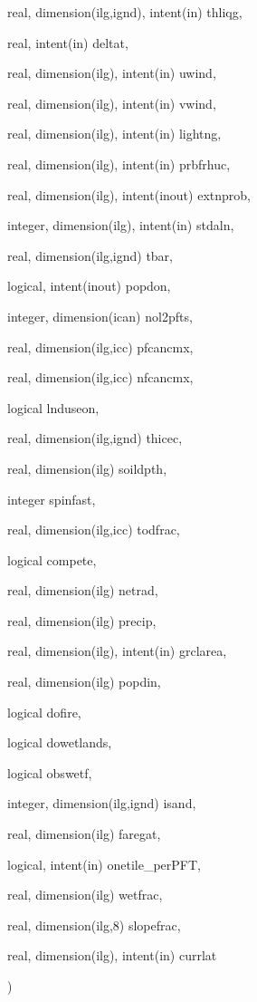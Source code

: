 {\begin{DoxyParamCaption}
\item[{real, dimension(ilg,ignd), intent(in)}]{thliqg, }
\item[{real, intent(in)}]{deltat, }
\item[{real, dimension(ilg), intent(in)}]{uwind, }
\item[{real, dimension(ilg), intent(in)}]{vwind, }
\item[{real, dimension(ilg), intent(in)}]{lightng, }
\item[{real, dimension(ilg), intent(in)}]{prbfrhuc, }
\item[{real, dimension(ilg), intent(inout)}]{extnprob, }
\item[{integer, dimension(ilg), intent(in)}]{stdaln, }
\item[{real, dimension(ilg,ignd)}]{tbar, }
\item[{logical, intent(inout)}]{popdon, }
\item[{integer, dimension(ican)}]{nol2pfts, }
\item[{real, dimension(ilg,icc)}]{pfcancmx, }
\item[{real, dimension(ilg,icc)}]{nfcancmx, }
\item[{logical}]{lnduseon, }
\item[{real, dimension(ilg,ignd)}]{thicec, }
\item[{real, dimension(ilg)}]{soildpth, }
\item[{integer}]{spinfast, }
\item[{real, dimension(ilg,icc)}]{todfrac, }
\item[{logical}]{compete, }
\item[{real, dimension(ilg)}]{netrad, }
\item[{real, dimension(ilg)}]{precip, }
\item[{real, dimension(ilg), intent(in)}]{grclarea, }
\item[{real, dimension(ilg)}]{popdin, }
\item[{logical}]{dofire, }
\item[{logical}]{dowetlands, }
\item[{logical}]{obswetf, }
\item[{integer, dimension(ilg,ignd)}]{isand, }
\item[{real, dimension(ilg)}]{faregat, }
\item[{logical, intent(in)}]{onetile\+\_\+per\+P\+F\+T, }
\item[{real, dimension(ilg)}]{wetfrac, }
\item[{real, dimension(ilg,8)}]{slopefrac, }
\item[{real, dimension(ilg), intent(in)}]{currlat}
\end{DoxyParamCaption}
)}\label{ctem_8f90_aeac1eecbe7347b17101ecc2cf445f146}

